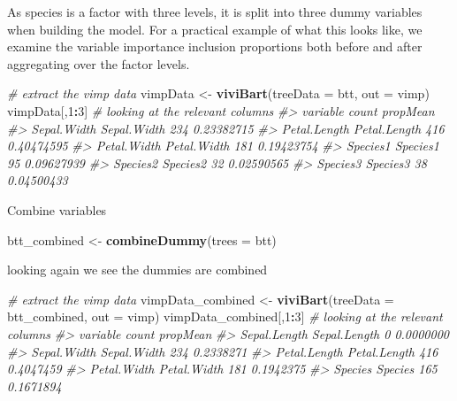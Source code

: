 \documentclass[
]{article}
\newenvironment{Shaded}{\begin{snugshade}}{\end{snugshade}}
\newcommand{\AttributeTok}[1]{\textcolor[rgb]{0.13,0.29,0.53}{#1}}
\newcommand{\CommentTok}[1]{\textcolor[rgb]{0.56,0.35,0.01}{\textit{#1}}}
\newcommand{\DecValTok}[1]{\textcolor[rgb]{0.00,0.00,0.81}{#1}}
\newcommand{\FunctionTok}[1]{\textcolor[rgb]{0.13,0.29,0.53}{\textbf{#1}}}
\newcommand{\NormalTok}[1]{#1}
\newcommand{\OtherTok}[1]{\textcolor[rgb]{0.56,0.35,0.01}{#1}}
\newcommand{\SpecialCharTok}[1]{\textcolor[rgb]{0.81,0.36,0.00}{\textbf{#1}}}
\newcommand{\StringTok}[1]{\textcolor[rgb]{0.31,0.60,0.02}{#1}}
\begin{document}
As species is a factor with three levels, it is split into three dummy
variables when building the model. For a practical example of what this
looks like, we examine the variable importance inclusion proportions
both before and after aggregating over the factor levels.

\begin{Shaded}
\begin{Highlighting}[]
\CommentTok{\# extract the vimp data}
\NormalTok{vimpData }\OtherTok{\textless{}{-}} \FunctionTok{viviBart}\NormalTok{(}\AttributeTok{treeData =}\NormalTok{ btt,  }\AttributeTok{out =} \StringTok{\textquotesingle{}vimp\textquotesingle{}}\NormalTok{)}
\NormalTok{vimpData[,}\DecValTok{1}\SpecialCharTok{:}\DecValTok{3}\NormalTok{] }\CommentTok{\# looking at the relevant columns}
\CommentTok{\#\textgreater{}                  variable count   propMean}
\CommentTok{\#\textgreater{} Sepal.Width   Sepal.Width   234 0.23382715}
\CommentTok{\#\textgreater{} Petal.Length Petal.Length   416 0.40474595}
\CommentTok{\#\textgreater{} Petal.Width   Petal.Width   181 0.19423754}
\CommentTok{\#\textgreater{} Species1         Species1    95 0.09627939}
\CommentTok{\#\textgreater{} Species2         Species2    32 0.02590565}
\CommentTok{\#\textgreater{} Species3         Species3    38 0.04500433}
\end{Highlighting}
\end{Shaded}

Combine variables

\begin{Shaded}
\begin{Highlighting}[]
\NormalTok{btt\_combined }\OtherTok{\textless{}{-}} \FunctionTok{combineDummy}\NormalTok{(}\AttributeTok{trees =}\NormalTok{ btt)}
\end{Highlighting}
\end{Shaded}

looking again we see the dummies are combined

\begin{Shaded}
\begin{Highlighting}[]
\CommentTok{\# extract the vimp data}
\NormalTok{vimpData\_combined }\OtherTok{\textless{}{-}} \FunctionTok{viviBart}\NormalTok{(}\AttributeTok{treeData =}\NormalTok{ btt\_combined,  }\AttributeTok{out =} \StringTok{\textquotesingle{}vimp\textquotesingle{}}\NormalTok{)}
\NormalTok{vimpData\_combined[,}\DecValTok{1}\SpecialCharTok{:}\DecValTok{3}\NormalTok{] }\CommentTok{\# looking at the relevant columns}
\CommentTok{\#\textgreater{}                  variable count  propMean}
\CommentTok{\#\textgreater{} Sepal.Length Sepal.Length     0 0.0000000}
\CommentTok{\#\textgreater{} Sepal.Width   Sepal.Width   234 0.2338271}
\CommentTok{\#\textgreater{} Petal.Length Petal.Length   416 0.4047459}
\CommentTok{\#\textgreater{} Petal.Width   Petal.Width   181 0.1942375}
\CommentTok{\#\textgreater{} Species           Species   165 0.1671894}
\end{Highlighting}
\end{Shaded}
\end{document}
